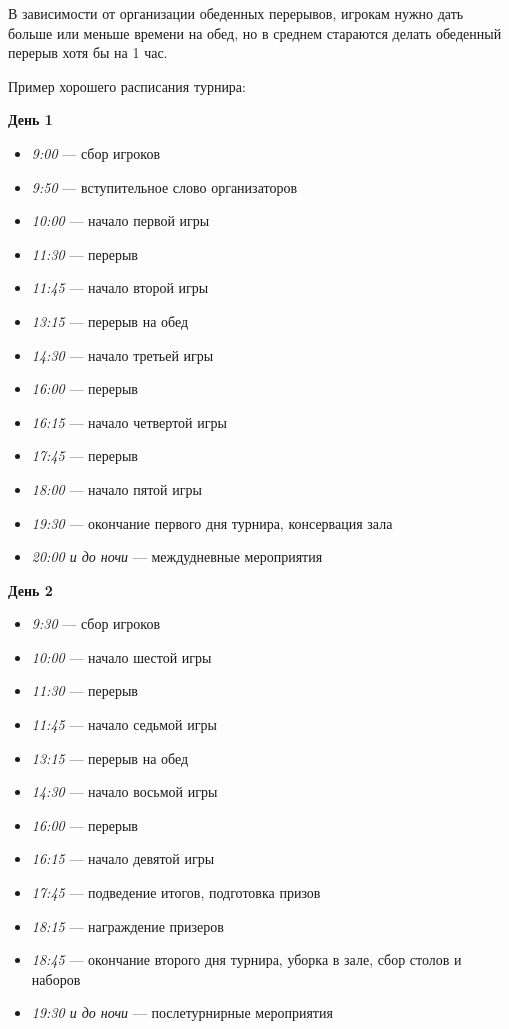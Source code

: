 В зависимости от организации обеденных перерывов, игрокам нужно дать больше или меньше времени на обед, но в среднем стараются делать обеденный перерыв хотя бы на 1 час.

Пример хорошего расписания турнира:

\textbf{День 1}

\begin{itemize}
	\item \textit{9:00} --- сбор игроков
	\item \textit{9:50} --- вступительное слово организаторов
	\item \textit{10:00} --- начало первой игры
	\item \textit{11:30} --- перерыв
	\item \textit{11:45} --- начало второй игры
	\item \textit{13:15} --- перерыв на обед
	\item \textit{14:30} --- начало третьей игры
	\item \textit{16:00} --- перерыв
	\item \textit{16:15} --- начало четвертой игры
	\item \textit{17:45} --- перерыв
	\item \textit{18:00} --- начало пятой игры
	\item \textit{19:30} --- окончание первого дня турнира, консервация зала
	\item \textit{20:00 и до ночи} --- междудневные мероприятия
\end{itemize}

\textbf{День 2}

\begin{itemize}
	\item \textit{9:30} --- сбор игроков
	\item \textit{10:00} --- начало шестой игры
	\item \textit{11:30} --- перерыв
	\item \textit{11:45} --- начало седьмой игры
	\item \textit{13:15} --- перерыв на обед
	\item \textit{14:30} --- начало восьмой игры
	\item \textit{16:00} --- перерыв
	\item \textit{16:15} --- начало девятой игры
	\item \textit{17:45} --- подведение итогов, подготовка призов
	\item \textit{18:15} --- награждение призеров
	\item \textit{18:45} --- окончание второго дня турнира, уборка в зале, сбор столов и наборов
	\item \textit{19:30 и до ночи} --- послетурнирные мероприятия
\end{itemize}

